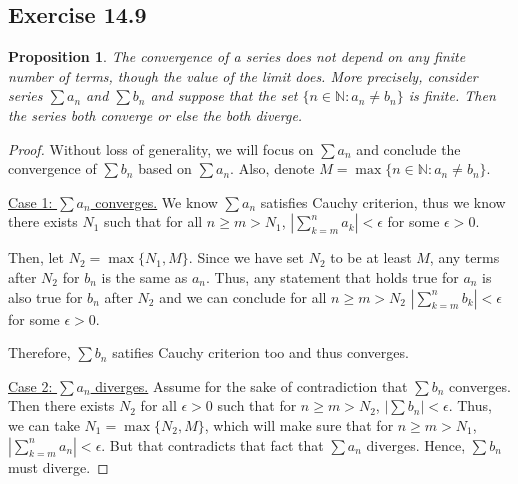 \documentclass{article}
\newtheorem{proposition}[thm]{Proposition}
\begin{document}
\subsection*{Exercise 14.9}
\begin{proposition}
    The convergence of a series does not depend on any finite number of terms, though the 
    value of the limit does. More precisely, consider series $\sum a_n$ and $\sum b_n$ and suppose 
    that the set $\{n\in\mathbb{N}:a_n\neq b_n\}$ is finite. Then the series both converge or else 
    the both diverge.
\end{proposition}
\begin{proof}
    Without loss of generality, we will focus on $\sum a_n$ and conclude the convergence of 
    $\sum b_n$ based on $\sum a_n$. Also, denote $M=\max\{n\in\mathbb{N}:a_n\neq b_n\}$.

    \underline{Case 1: $\sum a_n$ converges.} We know $\sum a_n$ satisfies Cauchy criterion, 
    thus we know there exists $N_1$ such that for all $n\ge m>N_1$, 
    $\left|\sum_{k=m}^{n}a_k\right|<\epsilon$ for some $\epsilon>0$. 
    
    Then, let 
    $N_2=\max\{N_1, M\}$. Since we have set $N_2$ to be at least $M$, any terms after $N_2$ for 
    $b_n$ is the same as $a_n$. Thus, any statement that holds true for $a_n$ is also true for $b_n$
    after $N_2$ and we can conclude for all $n\ge m>N_2$ $\left|\sum_{k=m}^{n}b_k\right|<\epsilon$ 
    for some $\epsilon>0$.

    Therefore, $\sum b_n$ satifies Cauchy criterion too and thus converges.

    \underline{Case 2: $\sum a_n$ diverges.} Assume for the sake of contradiction that $\sum b_n$ 
    converges. Then there exists $N_2$ for all $\epsilon>0$ such that for $n\ge m>N_2$, 
    $\left|\sum b_n\right|<\epsilon$. Thus, we can take $N_1=\max\{N_2,M\}$, which will make sure 
    that for $n\ge m>N_1$, $\left|\sum_{k=m}^n a_n\right|<\epsilon$. 
    But that contradicts that fact that $\sum a_n$ diverges. Hence, $\sum b_n$ must diverge.
\end{proof}
\end{document}
